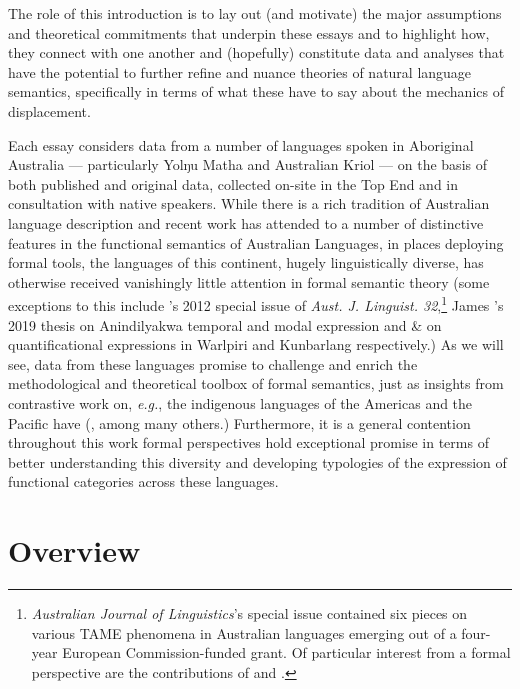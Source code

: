 \documentclass[12pt,dvipsnames]{report}
\begin{document}
The role of this introduction is to lay out (and motivate) the major assumptions and theoretical commitments that underpin these essays and to highlight how, they connect with one another and (hopefully) constitute data and analyses that have the potential to further refine and nuance theories of natural language semantics, specifically in terms of what these have to say about the mechanics of displacement.



Each essay considers data from a number of languages spoken in Aboriginal Australia --- particularly Yolŋu Matha and Australian Kriol --- on the basis of both published and original data, collected on-site in the Top End and in consultation with native speakers. While there is a rich tradition of Australian language description and recent work has attended to a number of distinctive features in the functional semantics of Australian Languages, in places deploying formal tools, the languages of this continent, hugely linguistically diverse, has otherwise received vanishingly little attention in formal semantic theory (some exceptions to this include \citeauthor{Stirling2012}'s 2012 special issue of \textit{Aust. J. Linguist. 32},\footnote{\textit{Australian Journal of Linguistics}'s special issue contained six pieces on various TAME phenomena in Australian languages emerging out of a four-year European Commission-funded grant. Of particular interest from a formal perspective are the contributions of \citet{Caudal2012} and \citet{Ritz2012}.} James \citeauthor{Bednall2019}'s 2019 thesis on Anindilyakwa temporal and modal expression and \citealt{Bowler2014} \& \citealt{Kapitonov2018} on quantificational expressions in Warlpiri and Kunbarlang respectively.) As we will see, data from these languages promise to challenge and enrich the methodological and theoretical toolbox of formal semantics, just as insights from contrastive work on, \textit{e.g.}, the indigenous languages of the Americas and the Pacific have (\citealp[\textit{e.g.},][]{Matthewson2006,Tonhauser2007,Krifka2016,VonPrince2018,Bochnak2019}, among many others.) Furthermore, it is a general contention throughout this work formal perspectives hold exceptional promise in terms of better understanding this diversity and developing typologies of the expression of functional categories across these languages.

\section{Overview}\label{sec:overview}
\end{document}
